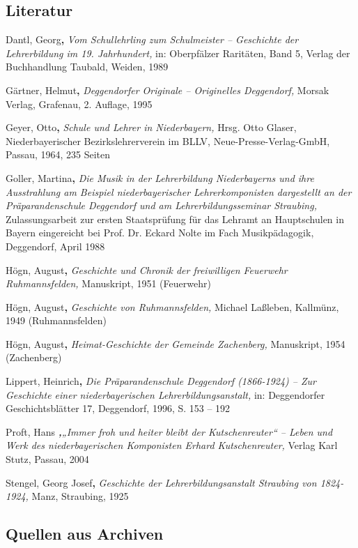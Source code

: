 \documentclass{book}
\begin{document}
\subsection{Literatur}

Dantl, Georg\textbf{,} \textit{Vom Schullehrling zum Schulmeister –
Geschichte der Lehrerbildung im 19. Jahrhundert,} in: Oberpfälzer
Raritäten, Band 5, Verlag der Buchhandlung Taubald, Weiden, 1989

Gärtner, Helmut\textbf{,} \textit{Deggendorfer Originale – Originelles
Deggendorf,} Morsak Verlag, Grafenau, 2. Auflage, 1995

Geyer, Otto\textbf{,} \textit{Schule und Lehrer in Niederbayern,} Hrsg.
Otto Glaser, Niederbayerischer Bezirkslehrerverein im BLLV,
Neue-Presse-Verlag-GmbH, Passau, 1964, 235 Seiten

Goller, Martina\textbf{,} \textit{Die Musik in der Lehrerbildung
Niederbayerns und ihre Ausstrahlung am Beispiel niederbayerischer
Lehrerkomponisten dargestellt an der Präparandenschule Deggendorf und
am Lehrerbildungsseminar Straubing,} Zulassungsarbeit zur ersten
Staatsprüfung für das Lehramt an Hauptschulen in Bayern eingereicht
bei Prof. Dr. Eckard Nolte im Fach Musikpädagogik, Deggendorf, April
1988

Högn, August\textbf{,} \textit{Geschichte und Chronik der freiwilligen
Feuerwehr Ruhmannsfelden,} Manuskript, 1951 (Feuerwehr)

Högn, August\textbf{,} \textit{Geschichte von Ruhmannsfelden,} Michael
Laßleben, Kallmünz, 1949 (Ruhmannsfelden)

Högn, August\textbf{,} \textit{Heimat-Geschichte der Gemeinde
Zachenberg,} Manuskript, 1954 (Zachenberg)

Lippert, Heinrich\textbf{,} \textit{Die Präparandenschule Deggendorf
(1866-1924) – Zur Geschichte einer niederbayerischen
Lehrerbildungsanstalt,} in: Deggendorfer Geschichtsblätter 17,
Deggendorf, 1996, S. 153 – 192

Proft, Hans \textbf{\textit{,}}\textit{„Immer froh und heiter bleibt der
Kutschenreuter“ – Leben und Werk des niederbayerischen Komponisten
Erhard Kutschenreuter,} Verlag Karl Stutz, Passau, 2004

Stengel, Georg Josef\textbf{,} \textit{Geschichte der
Lehrerbildungsanstalt Straubing von 1824-1924,} Manz, Straubing, 1925

\subsection{Quellen aus Archiven}
\end{document}
